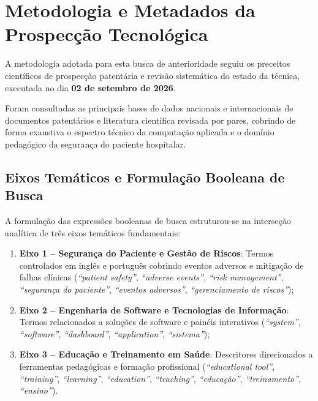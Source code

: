 \chapter{Metodologia e Metadados da Prospecção Tecnológica}
\label{cap_metodologia_metadados}

A metodologia adotada para esta busca de anterioridade seguiu os preceitos científicos de prospecção patentária e revisão sistemática do estado da técnica, executada no dia \textbf{02 de setembro de 2026}. 

Foram consultadas as principais bases de dados nacionais e internacionais de documentos patentários e literatura científica revisada por pares, cobrindo de forma exaustiva o espectro técnico da computação aplicada e o domínio pedagógico da segurança do paciente hospitalar.

\section{Eixos Temáticos e Formulação Booleana de Busca}
\label{sec_eixos_tematicos}

A formulação das expressões booleanas de busca estruturou-se na interseção analítica de três eixos temáticos fundamentais:
\begin{enumerate}
    \item \textbf{Eixo 1 -- Segurança do Paciente e Gestão de Riscos}: Termos controlados em inglês e português cobrindo eventos adversos e mitigação de falhas clínicas (\textit{``patient safety''}, \textit{``adverse events''}, \textit{``risk management''}, \textit{``segurança do paciente''}, \textit{``eventos adversos''}, \textit{``gerenciamento de riscos''});
    \item \textbf{Eixo 2 -- Engenharia de Software e Tecnologias de Informação}: Termos relacionados a soluções de software e painéis interativos (\textit{``system''}, \textit{``software''}, \textit{``dashboard''}, \textit{``application''}, \textit{``sistema''});
    \item \textbf{Eixo 3 -- Educação e Treinamento em Saúde}: Descritores direcionados a ferramentas pedagógicas e formação profissional (\textit{``educational tool''}, \textit{``training''}, \textit{``learning''}, \textit{``education''}, \textit{``teaching''}, \textit{``educação''}, \textit{``treinamento''}, \textit{``ensino''}).
\end{enumerate}

